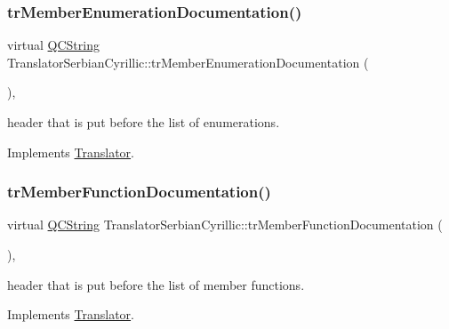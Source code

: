 \subsubsection{\texorpdfstring{trMemberEnumerationDocumentation()}{trMemberEnumerationDocumentation()}}
{\footnotesize\ttfamily virtual \mbox{\hyperlink{class_q_c_string}{Q\+C\+String}} Translator\+Serbian\+Cyrillic\+::tr\+Member\+Enumeration\+Documentation (\begin{DoxyParamCaption}{ }\end{DoxyParamCaption})\hspace{0.3cm}{\ttfamily [inline]}, {\ttfamily [virtual]}}

header that is put before the list of enumerations. 

Implements \mbox{\hyperlink{class_translator}{Translator}}.

\mbox{\label{class_translator_serbian_cyrillic_a36eb139bb421a0c0a269d97d5da81798}} 
\subsubsection{\texorpdfstring{trMemberFunctionDocumentation()}{trMemberFunctionDocumentation()}}
{\footnotesize\ttfamily virtual \mbox{\hyperlink{class_q_c_string}{Q\+C\+String}} Translator\+Serbian\+Cyrillic\+::tr\+Member\+Function\+Documentation (\begin{DoxyParamCaption}{ }\end{DoxyParamCaption})\hspace{0.3cm}{\ttfamily [inline]}, {\ttfamily [virtual]}}

header that is put before the list of member functions. 

Implements \mbox{\hyperlink{class_translator}{Translator}}.

\mbox{\label{class_translator_serbian_cyrillic_a8178707506520839986ec5fb9c0ed15c}} 
